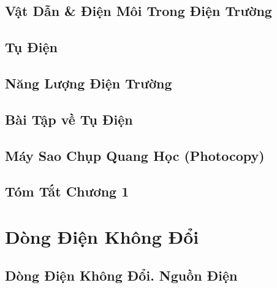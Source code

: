 \documentclass[oneside]{book}
\numberwithin{equation}{section}
\begin{document}

\section{Vật Dẫn \& Điện Môi Trong Điện Trường}


\section{Tụ Điện}


\section{Năng Lượng Điện Trường}


\section{Bài Tập về Tụ Điện}


\section{Máy Sao Chụp Quang Học (Photocopy)}


\section{Tóm Tắt Chương 1}


\chapter{Dòng Điện Không Đổi}

\section{Dòng Điện Không Đổi. Nguồn Điện}
\end{document}
